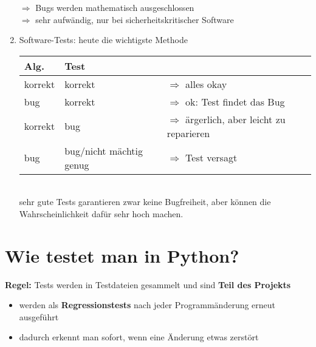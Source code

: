 \begin{enumerate}
        $\Rightarrow$ Bugs werden mathematisch ausgeschlossen \\
        $\Rightarrow$ sehr aufwändig, nur bei sicherheitskritischer Software
        \item Software-Tests: heute die wichtigste Methode \\
        \begin{tabular}{C{2cm} | C{4cm} L{5cm}}
            Alg. & Test & \\ \hline
            korrekt & korrekt & $\Rightarrow$ alles okay\\
            bug & korrekt & $\Rightarrow$ ok: Test findet das Bug\\
            korrekt & bug & $\Rightarrow$ ärgerlich, aber leicht zu reparieren\\
            bug & bug/nicht mächtig genug & $\Rightarrow$ Test versagt \\
        \end{tabular}\\

        sehr gute Tests garantieren zwar keine Bugfreiheit, aber können die Wahrscheinlichkeit dafür sehr hoch machen.
    \end{enumerate}

\section{Wie testet man in Python?}
\textbf{Regel:} Tests werden in Testdateien gesammelt und sind \textbf{Teil des Projekts}
\begin{itemize}[label={$\Rightarrow$}]
    \item werden als \textbf{Regressionstests} nach jeder Programmänderung erneut ausgeführt
    \item dadurch erkennt man sofort, wenn eine Änderung etwas zerstört
\end{itemize}


